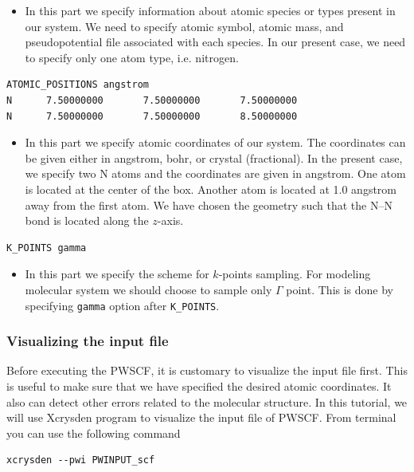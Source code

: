 \documentclass[12pt,english]{paper}
\begin{document}
\begin{itemize}
\item In this part we specify information about atomic species or types
present in our system. We need to specify atomic symbol, atomic mass,
and pseudopotential file associated with each species. In our present
case, we need to specify only one atom type, i.e. nitrogen.
\end{itemize}
\begin{lstlisting}
ATOMIC_POSITIONS angstrom
N      7.50000000       7.50000000       7.50000000
N      7.50000000       7.50000000       8.50000000
\end{lstlisting}

\begin{itemize}
\item In this part we specify atomic coordinates of our system. The coordinates
can be given either in angstrom, bohr, or crystal (fractional). In
the present case, we specify two N atoms and the coordinates are given
in angstrom. One atom is located at the center of the box. Another
atom is located at 1.0 angstrom away from the first atom. We have
chosen the geometry such that the N--N bond is located along the $z$-axis.
\end{itemize}
\begin{lstlisting}
K_POINTS gamma
\end{lstlisting}

\begin{itemize}
\item In this part we specify the scheme for $k$-points sampling. For modeling
molecular system we should choose to sample only $\Gamma$ point.
This is done by specifying \texttt{gamma} option after \texttt{K\_POINTS}.
\end{itemize}

\subsubsection{Visualizing the input file}

Before executing the PWSCF, it is customary to visualize the input
file first. This is useful to make sure that we have specified the
desired atomic coordinates. It also can detect other errors related
to the molecular structure. In this tutorial, we will use Xcrysden
program \cite{Kokalj2003} to visualize the input file of PWSCF. From
terminal you can use the following command

\begin{lstlisting}
xcrysden --pwi PWINPUT_scf
\end{lstlisting}
\end{document}
